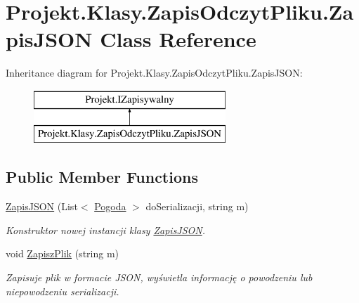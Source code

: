 \hypertarget{class_projekt_1_1_klasy_1_1_zapis_odczyt_pliku_1_1_zapis_j_s_o_n}{}\section{Projekt.\+Klasy.\+Zapis\+Odczyt\+Pliku.\+Zapis\+J\+S\+ON Class Reference}
\label{class_projekt_1_1_klasy_1_1_zapis_odczyt_pliku_1_1_zapis_j_s_o_n}
Inheritance diagram for Projekt.\+Klasy.\+Zapis\+Odczyt\+Pliku.\+Zapis\+J\+S\+ON\+:\begin{figure}[H]
\begin{center}
\leavevmode
\includegraphics[height=2.000000cm]{class_projekt_1_1_klasy_1_1_zapis_odczyt_pliku_1_1_zapis_j_s_o_n}
\end{center}
\end{figure}
\subsection*{Public Member Functions}
\begin{DoxyCompactItemize}
\item 
\mbox{\hyperlink{class_projekt_1_1_klasy_1_1_zapis_odczyt_pliku_1_1_zapis_j_s_o_n_ac4c8bcd41a88b8755f686a76a90cf39c}{Zapis\+J\+S\+ON}} (List$<$ \mbox{\hyperlink{class_projekt_1_1_baza_1_1_pogoda}{Pogoda}} $>$ do\+Serializacji, string m)
\begin{DoxyCompactList}\small\item\em Konstruktor nowej instancji klasy \mbox{\hyperlink{class_projekt_1_1_klasy_1_1_zapis_odczyt_pliku_1_1_zapis_j_s_o_n}{Zapis\+J\+S\+ON}}. \end{DoxyCompactList}\item 
void \mbox{\hyperlink{class_projekt_1_1_klasy_1_1_zapis_odczyt_pliku_1_1_zapis_j_s_o_n_a8a947e364a71755f2a00b0d7c8236cee}{Zapisz\+Plik}} (string m)
\begin{DoxyCompactList}\small\item\em Zapisuje plik w formacie J\+S\+ON, wyświetla informację o powodzeniu lub niepowodzeniu serializacji. \end{DoxyCompactList}\end{DoxyCompactItemize}


